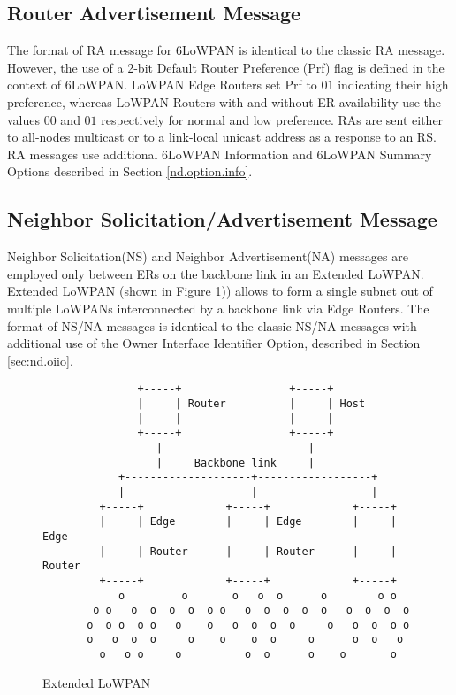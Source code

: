 \subsection{Router Advertisement Message}
The format of RA message for 6LoWPAN is identical to the classic \cite{rfc4861} RA message. However, the use of a 2-bit  Default Router Preference (Prf) flag \cite{rfc4191} is defined in the context of 6LoWPAN. LoWPAN Edge Routers set Prf to $01$ indicating their high preference, whereas LoWPAN Routers with and without ER availability use the values $00$ and $01$ respectively for normal and low preference. RAs are sent either to all-nodes multicast or to a link-local unicast address as a response to an RS. RA messages use additional 6LoWPAN Information and 6LoWPAN Summary Options described in Section \ref{nd.option.info}.

\subsection{Neighbor Solicitation/Advertisement Message}
Neighbor Solicitation(NS) and Neighbor Advertisement(NA) messages are employed only between ERs on the backbone link in an Extended LoWPAN. Extended LoWPAN (shown in Figure \ref{fig:ext.lowpan})) allows to form a single subnet out of multiple LoWPANs interconnected by a backbone link via Edge Routers. The format of NS/NA messages is identical to the classic NS/NA messages \cite{rfc4861} with additional use of the Owner Interface Identifier Option, described in Section \ref{sec:nd.oiio}. 

\begin{figure}[htp]
\begin{mylisting}
\begin{verbatim}
               +-----+                 +-----+
               |     | Router          |     | Host
               |     |                 |     |
               +-----+                 +-----+
                  |                       |
                  |     Backbone link     |
            +--------------------+------------------+
            |                    |                  |
         +-----+             +-----+             +-----+
         |     | Edge        |     | Edge        |     | Edge
         |     | Router      |     | Router      |     | Router
         +-----+             +-----+             +-----+
            o         o       o   o  o      o        o o
        o o   o  o  o  o  o o   o  o  o  o  o   o  o  o  o
       o  o o  o o   o    o   o  o  o  o     o   o  o  o o
       o   o  o  o     o    o    o  o     o      o  o   o
         o   o o     o          o  o      o    o       o
\end{verbatim}
\end{mylisting}
\caption{Extended LoWPAN}\label{fig:ext.lowpan}
\end{figure}

